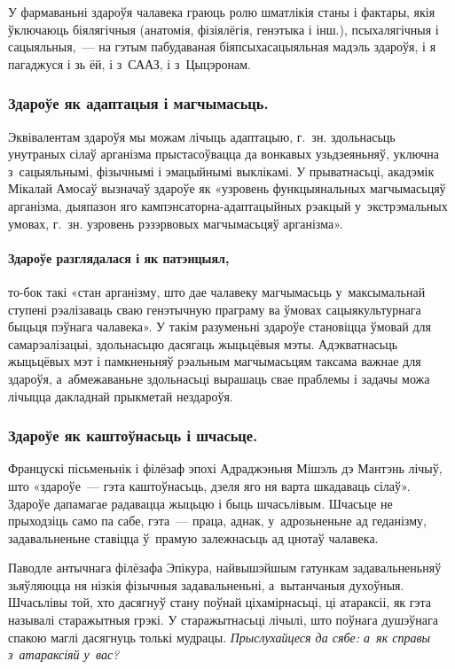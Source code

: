 У фармаваньні здароўя чалавека граюць ролю шматлікія станы і фактары, якія ўключаюць біялягічныя (анатомія, фізіялёгія, генэтыка і інш.), псыхалягічныя і сацыяльныя,~--- на гэтым пабудаваная біяпсыхасацыяльная мадэль здароўя, і я пагаджуся і зь ёй, і з~СААЗ, і з~Цыцэронам.


\subsubsection{Здароўе як адаптацыя і магчымасьць.}

Эквівалентам здароўя мы можам лічыць адаптацыю, г.~зн. здольнасьць унутраных сілаў арганізма прыстасоўвацца да вонкавых узьдзеяньняў, уключна з~сацыяльнымі, фізычнымі і эмацыйнымі выклікамі. У прыватнасьці, акадэмік Мікалай Амосаў вызначаў здароўе як «узровень функцыянальных магчымасьцяў арганізма, дыяпазон яго кампэнсаторна-адаптацыйных рэакцый у~экстрэмальных умовах, г.~зн. узровень рэзэрвовых магчымасьцяў арганізма».

\paragraph{Здароўе разглядалася і як патэнцыял,} то-бок такі «стан арганізму, што дае чалавеку магчымасьць у~максымальнай ступені рэалізаваць сваю генэтычную праграму ва ўмовах сацыякультурнага быцьця пэўнага чалавека». У такім разуменьні здароўе становіцца ўмовай для самарэалізацыі, здольнасьцю дасягаць жыцьцёвыя мэты. Адэкватнасьць жыцьцёвых мэт і памкненьняў рэальным магчымасьцям таксама важнае для здароўя, а~абмежаваньне здольнасьці вырашаць свае праблемы і задачы можа лічыцца дакладнай прыкметай нездароўя.

\subsubsection{Здароўе як каштоўнасьць і шчасьце.}

Францускі пісьменьнік і філёзаф эпохі Адраджэньня Мішэль дэ Мантэнь лічыў, што «здароўе~--- гэта каштоўнасьць, дзеля яго ня варта шкадаваць сілаў». Здароўе дапамагае радавацца жыцьцю і быць шчасьлівым. Шчасьце не прыходзіць само па сабе, гэта~--- праца, аднак, у~адрозьненьне ад геданізму, задавальненьне ставіцца ў~прамую залежнасьць ад цнотаў чалавека.

Паводле антычнага філёзафа Эпікура, найвышэйшым гатункам задавальненьняў зьяўляюцца ня нізкія фізычныя задавальненьні, а~вытанчаныя духоўныя. Шчасьлівы той, хто дасягнуў стану поўнай ціхамірнасьці, ці атараксіі, як гэта называлі старажытныя грэкі. У старажытнасьці лічылі, што поўнага душэўнага спакою маглі дасягнуць толькі мудрацы. \emph{Прыслухайцеся да сябе: а~як справы з~атараксіяй у~вас?}

